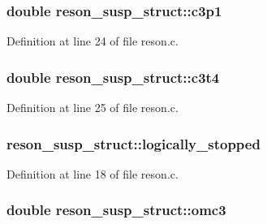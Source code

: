 \subsubsection[{\texorpdfstring{c3p1}{c3p1}}]{\setlength{\rightskip}{0pt plus 5cm}double reson\+\_\+susp\+\_\+struct\+::c3p1}\hypertarget{structreson__susp__struct_a7ed9da389fc8a8985340127ea5a61a5c}{}\label{structreson__susp__struct_a7ed9da389fc8a8985340127ea5a61a5c}


Definition at line 24 of file reson.\+c.

\subsubsection[{\texorpdfstring{c3t4}{c3t4}}]{\setlength{\rightskip}{0pt plus 5cm}double reson\+\_\+susp\+\_\+struct\+::c3t4}\hypertarget{structreson__susp__struct_a11dfcee72e3e6492ba48772beff018e8}{}\label{structreson__susp__struct_a11dfcee72e3e6492ba48772beff018e8}


Definition at line 25 of file reson.\+c.

\subsubsection[{\texorpdfstring{logically\+\_\+stopped}{logically_stopped}}]{ reson\+\_\+susp\+\_\+struct\+::logically\+\_\+stopped}\hypertarget{structreson__susp__struct_aa13087b9780f21de5fe679d7f5ce7281}{}\label{structreson__susp__struct_aa13087b9780f21de5fe679d7f5ce7281}


Definition at line 18 of file reson.\+c.

\subsubsection[{\texorpdfstring{omc3}{omc3}}]{\setlength{\rightskip}{0pt plus 5cm}double reson\+\_\+susp\+\_\+struct\+::omc3}\hypertarget{structreson__susp__struct_a42e2baa9e1257f633e683e76c6083953}{}\label{structreson__susp__struct_a42e2baa9e1257f633e683e76c6083953}


